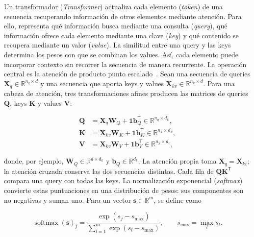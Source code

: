 Un transformador (\emph{Transformer}) actualiza cada elemento (\emph{token}) de una secuencia
recuperando información de otros elementos mediante atención. Para ello,
representa qué información busca mediante una consulta (\emph{query}), qué
información ofrece cada elemento mediante una clave (\emph{key}) y qué contenido
se recupera mediante un valor (\emph{value}). La similitud entre una query y las
keys determina los pesos con que se combinan los values. Así, cada elemento
puede incorporar contexto sin recorrer la secuencia de manera recurrente.
La operación central es la atención de producto punto
escalado~\cite{vaswani_attention_2017}. Sean una secuencia de queries
\(\mathbf X_q\in\mathbb R^{n_q\times d}\) y una secuencia que aporta keys y
values \(\mathbf X_{kv}\in\mathbb R^{n_k\times d}\). Para una cabeza de
atención, tres transformaciones afines producen las matrices de queries
\(\mathbf Q\), keys \(\mathbf K\) y values \(\mathbf V\):

\begin{equation}
    \begin{aligned}
    \mathbf Q&=\mathbf X_q\mathbf W_Q+\mathbf 1\mathbf b_Q^{\mathsf T}
        \in\mathbb R^{n_q\times d_k},\\
    \mathbf K&=\mathbf X_{kv}\mathbf W_K+\mathbf 1\mathbf b_K^{\mathsf T}
        \in\mathbb R^{n_k\times d_k},\\
    \mathbf V&=\mathbf X_{kv}\mathbf W_V+\mathbf 1\mathbf b_V^{\mathsf T}
        \in\mathbb R^{n_k\times d_v},
    \end{aligned}
    \label{eq:qkv-transformer}
\end{equation}

donde, por ejemplo, \(\mathbf W_Q\in\mathbb R^{d\times d_k}\) y
\(\mathbf b_Q\in\mathbb R^{d_k}\). La atención propia toma
\(\mathbf X_q=\mathbf X_{kv}\); la atención cruzada conserva las dos secuencias
distintas. Cada fila de \(\mathbf Q\mathbf K^{\mathsf T}\) compara una query
con todas las keys. La normalización exponencial (\emph{softmax}) convierte
estas puntuaciones en una distribución de pesos: sus componentes son no
negativas y suman uno. Para un vector \(\mathbf s\in\mathbb R^{m}\), se define
como

\begin{equation}
    \operatorname{softmax}(\mathbf s)_j
    =\frac{\exp(s_j-s_{\max})}
    {\sum_{l=1}^{m}\exp(s_l-s_{\max})},
    \qquad s_{\max}=\max_l s_l .
    \label{eq:definicion-softmax}
\end{equation}

